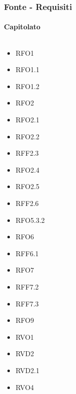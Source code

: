 \subsubsection{Fonte - Requisiti}

\paragraph{Capitolato}
$\medspace$
\begin{multicols}{3}
    \begin{itemize}
        \item RFO1
        \item RFO1.1
        \item RFO1.2
        \item RFO2
        \item RFO2.1
        \item RFO2.2
        \item RFF2.3
        \item RFO2.4
        \item RFO2.5
        \item RFF2.6
        \item RFO5.3.2
        \item RFO6
        \item RFF6.1
        \item RFO7
        \item RFF7.2
        \item RFF7.3
        \item RFO9
        \item RVO1
        \item RVD2
        \item RVD2.1
        \item RVO4
    \end{itemize}
\end{multicols}

